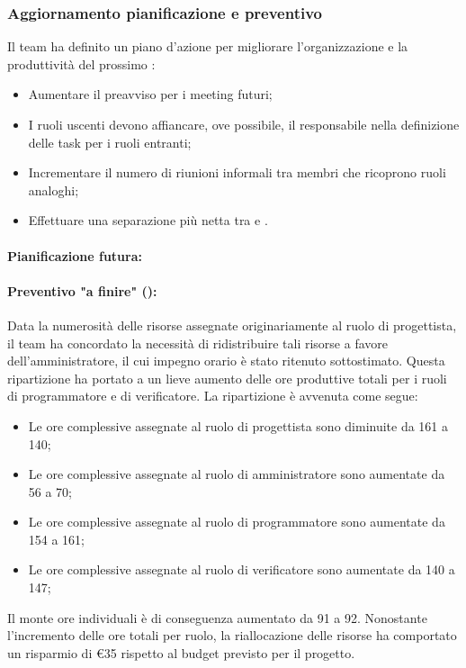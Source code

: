 \subsubsection{Aggiornamento pianificazione e preventivo}
\par Il team ha definito un piano d'azione per migliorare l'organizzazione e la produttività del prossimo :
\begin{itemize}
  \item Aumentare il preavviso per i meeting futuri;
  \item I ruoli uscenti devono affiancare, ove possibile, il responsabile nella definizione delle task per i ruoli entranti;
  \item Incrementare il numero di riunioni informali tra membri che ricoprono ruoli analoghi;
  \item Effettuare una separazione più netta tra  e .
\end{itemize}

\paragraph*{Pianificazione futura:}

\paragraph*{Preventivo "a finire" ():}
\par Data la numerosità delle risorse assegnate originariamente al ruolo di progettista, il team ha concordato la necessità di ridistribuire tali risorse a favore dell'amministratore, il cui impegno orario è stato ritenuto sottostimato. Questa ripartizione ha portato a un lieve aumento delle ore produttive totali per i ruoli di programmatore e di verificatore. 
La ripartizione è avvenuta come segue:
\begin{itemize}
  \item Le ore complessive assegnate al ruolo di progettista sono diminuite da 161 a 140;
  \item Le ore complessive assegnate al ruolo di amministratore sono aumentate da 56 a 70;
  \item Le ore complessive assegnate al ruolo di programmatore sono aumentate da 154 a 161;
  \item Le ore complessive assegnate al ruolo di verificatore sono aumentate da 140 a 147;
\end{itemize}
Il monte ore individuali è di conseguenza aumentato da 91 a 92. Nonostante l'incremento delle ore totali per ruolo, la riallocazione delle risorse ha comportato un risparmio di €35 rispetto al budget previsto per il progetto.

